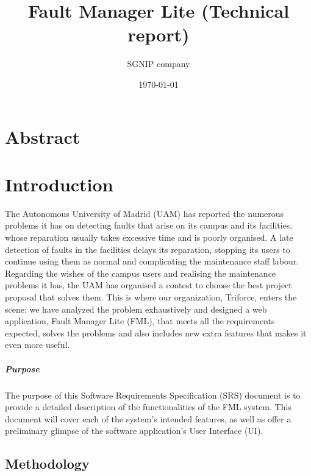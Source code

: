 \documentclass{report}
\title{Fault Manager Lite (Technical report)}
\date{\today}
\author{SGNIP company}
\begin{document}
\maketitle
\tableofcontents
\newpage
\chapter{Abstract}

\chapter{Introduction}

The Autonomous University of Madrid (UAM) has reported the numerous problems it has on detecting faults that arise on its campus and its facilities, whose reparation usually takes excessive time and is poorly organised. A late detection of faults in the facilities delays its reparation, stopping its users to continue using them as normal and complicating the maintenance staff labour. Regarding the wishes of the campus users and realising the maintenance problems it has, the UAM has organised a contest to choose the best project proposal that solves them. 
This is where our organization, Triforce, enters the scene: we have analyzed the problem exhaustively and designed a web application, Fault Manager Lite (FML), that meets all the requirements expected, solves the problems and also includes new extra features that makes it even more useful. 

\paragraph{Purpose}
The purpose of this Software Requirements Specification (SRS) document is to provide a
detailed description of the functionalities of the FML system. This document will cover each of the system’s intended features, as well as offer a preliminary glimpse of the software application’s User Interface (UI). 

\section{Methodology}
\end{document}
